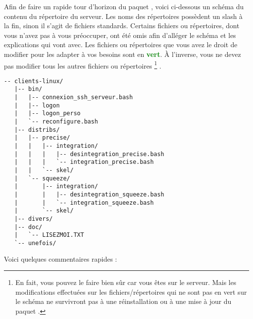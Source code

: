 Afin de faire un rapide tour d'horizon du paquet
, voici ci-dessous un 
schéma du contenu du répertoire
 du serveur.
Les noms des répertoires possèdent un slash à la fin,
sinon il s'agit de fichiers standards. Certains fichiers ou
répertoires, dont vous n'avez pas à vous préoccuper,
ont été omis afin d'alléger le schéma et les explications
qui vont avec. Les fichiers ou répertoires que vous avez
le droit de modifier pour les adapter à vos besoins sont en
\textbf{\textcolor{green}{vert}}. À l'inverse, vous ne devez
pas modifier tous les autres fichiers ou répertoires
%
\footnote{En fait, vous pouvez le faire bien sûr car vous
êtes  sur le serveur. Mais les modifications
effectuées sur les fichiers/répertoires qui ne sont pas en vert
sur le schéma ne survivront pas à une réinstallation ou à une mise à jour
du paquet .}%
.
%
\begin{lstlisting}[emph={logon_perso,skel,unefois,divers},emphstyle={\color{green}\textbf}]
-- clients-linux/
   |-- bin/
   |   |-- connexion_ssh_serveur.bash
   |   |-- logon
   |   |-- logon_perso
   |   `-- reconfigure.bash
   |-- distribs/
   |   |-- precise/
   |   |   |-- integration/
   |   |   |   |-- desintegration_precise.bash
   |   |   |   `-- integration_precise.bash
   |   |   `-- skel/
   |   `-- squeeze/
   |       |-- integration/
   |       |   |-- desintegration_squeeze.bash
   |       |   `-- integration_squeeze.bash
   |       `-- skel/
   |-- divers/
   |-- doc/
   |   `-- LISEZMOI.TXT
   `-- unefois/

\end{lstlisting}
%
Voici quelques commentaires rapides :
%
